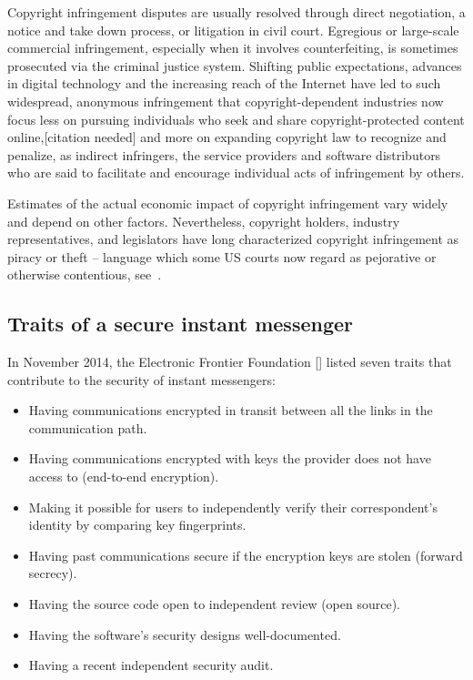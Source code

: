 Copyright infringement disputes are usually resolved through direct negotiation, a notice and take down process, or
litigation in civil court.
Egregious or large-scale commercial infringement, especially when it involves counterfeiting, is sometimes prosecuted
via the criminal justice system.
Shifting public expectations, advances in digital technology and the increasing reach of the Internet have led to such
widespread, anonymous infringement that copyright-dependent industries now focus less on pursuing individuals who seek
and share copyright-protected content online,[citation needed] and more on expanding copyright law to recognize and
penalize, as indirect infringers, the service providers and software distributors who are said to facilitate and
encourage individual acts of infringement by others.

Estimates of the actual economic impact of copyright infringement vary widely and depend on other factors.
Nevertheless, copyright holders, industry representatives, and legislators have long characterized copyright
infringement as piracy or theft – language which some US courts now regard as pejorative or otherwise contentious,
see~\cite{powell1984dowling, li2009intellectual}.

\subsection{Traits of a secure instant messenger}\label{subsec:traits-of-a-secure-instant-messenger}

In November 2014, the Electronic Frontier Foundation [\cite{von2010electronic}] listed seven traits that contribute to
the security of instant messengers:

\begin{itemize}
    \item Having communications encrypted in transit between all the links in the communication path.
    \item Having communications encrypted with keys the provider does not have access to (end-to-end encryption).
    \item Making it possible for users to independently verify their correspondent's identity by comparing key fingerprints.
    \item Having past communications secure if the encryption keys are stolen (forward secrecy).
    \item Having the source code open to independent review (open source).
    \item Having the software's security designs well-documented.
    \item Having a recent independent security audit.
\end{itemize}

